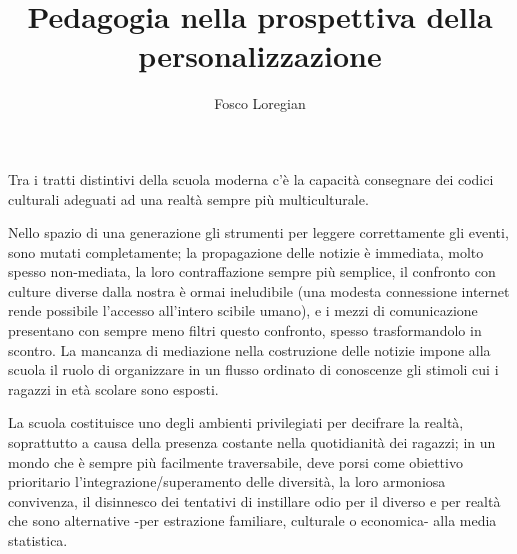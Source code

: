 \documentclass{article}
\title{Pedagogia nella prospettiva della personalizzazione}
\author{Fosco Loregian}
\begin{document}
\maketitle 

Tra i tratti distintivi della scuola moderna c'è la capacità consegnare dei codici culturali adeguati ad una realtà sempre più multiculturale.

Nello spazio di una generazione gli strumenti per leggere correttamente gli eventi, sono mutati completamente; la propagazione delle notizie è immediata, molto spesso non-mediata, la loro contraffazione sempre più semplice, il confronto con culture diverse dalla nostra è ormai ineludibile (una modesta connessione internet rende possibile l'accesso all'intero scibile umano), e i mezzi di comunicazione presentano con sempre meno filtri questo confronto, spesso trasformandolo in scontro. La mancanza di mediazione nella costruzione delle notizie impone alla scuola il ruolo di organizzare in un flusso ordinato di conoscenze gli stimoli cui i ragazzi in età scolare sono esposti. 

La scuola costituisce uno degli ambienti privilegiati per decifrare la realtà, soprattutto a causa della presenza costante nella quotidianità dei ragazzi; in un mondo che è sempre più facilmente traversabile, deve porsi come obiettivo prioritario l'integrazione\fshyp{}superamento delle diversità, la loro armoniosa convivenza, il disinnesco dei tentativi di instillare odio per il diverso e per realtà che sono alternative -per estrazione familiare, culturale o economica- alla media statistica.
\end{document}
